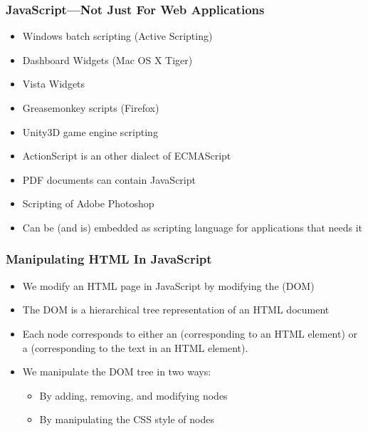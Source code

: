 \documentclass[svgnames,handout]{beamer}
\subtitle{JavaScript}
\author{Ken Friis Larsen\\\scriptsize (Some slides prepared together
  with Henning Niss)}
\begin{document}
\begin{frame}
  \titlepage{}
\end{frame}





\begin{frame} 
\frametitle{JavaScript---Not Just For Web Applications}

\begin{itemize}
\item Windows batch scripting (Active Scripting)
\item Dashboard Widgets (Mac OS X Tiger)
\item Vista Widgets
\item Greasemonkey scripts (Firefox)
\item Unity3D game engine scripting
\item ActionScript is an other dialect of ECMAScript
\item PDF documents can contain JavaScript
\item Scripting of Adobe Photoshop
\item Can be (and is) embedded as scripting language for applications
  that needs it
\end{itemize}
  
\end{frame}


\begin{frame}[fragile] 
\frametitle{Manipulating HTML In JavaScript}

\begin{itemize}
\item We modify an HTML page in JavaScript by modifying the
   (DOM)
\item The DOM is a hierarchical tree representation of an HTML document
\item Each node corresponds to either an 
  (corresponding to an HTML element) or a 
  (corresponding to the text in an HTML element).
\item We manipulate the DOM tree in two ways:
  \begin{itemize}
  \item By adding, removing, and modifying nodes
  \item By manipulating the CSS style of nodes
  \end{itemize}
\end{itemize}
\end{frame}
\end{document}
